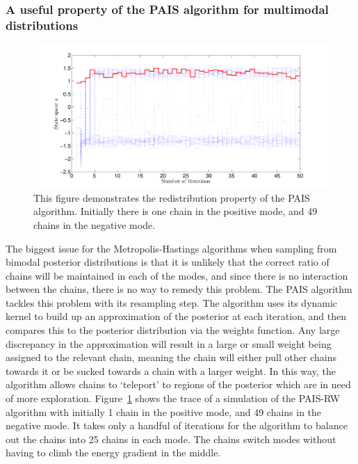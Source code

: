 \documentclass[final]{siamltex}
\begin{document}
\subsubsection{A useful property of the PAIS algorithm for multimodal distributions}

\begin{figure}[!ht]
\begin{center}
\includegraphics[width=\textwidth]{"figures/BM2_suction"}
\caption{This figure demonstrates the redistribution property of the
PAIS algorithm. Initially there is one chain in the positive mode, and
49 chains in the negative mode.}
\label{fig:BM2_suction}
\end{center}
\end{figure}

The biggest issue for the Metropolis-Hastings algorithms when sampling
from bimodal posterior distributions is that it is unlikely that the
correct ratio of chains will be maintained in each of the modes, and
since there is no interaction between the chains, there is no way to
remedy this problem. The PAIS algorithm tackles this problem with its
resampling step. The algorithm uses its dynamic kernel to build up an
approximation of the posterior at each iteration, and then compares
this to the posterior distribution via the weights function. Any large
discrepancy in the approximation will result in a large or small
weight being assigned to the relevant chain, meaning the chain will
either pull other chains towards it or be sucked towards a chain with
a larger weight. In this way, the algorithm allows chains to
`teleport' to regions of the posterior which are in need of more
exploration. Figure~\ref{fig:BM2_suction} shows the trace of a
simulation of the PAIS-RW algorithm with initially 1 chain in the
positive mode, and 49 chains in the negative mode. It takes only a
handful of iterations for the algorithm to balance out the chains into
25 chains in each mode. The chains switch modes without having to
climb the energy gradient in the middle.
\end{document}
